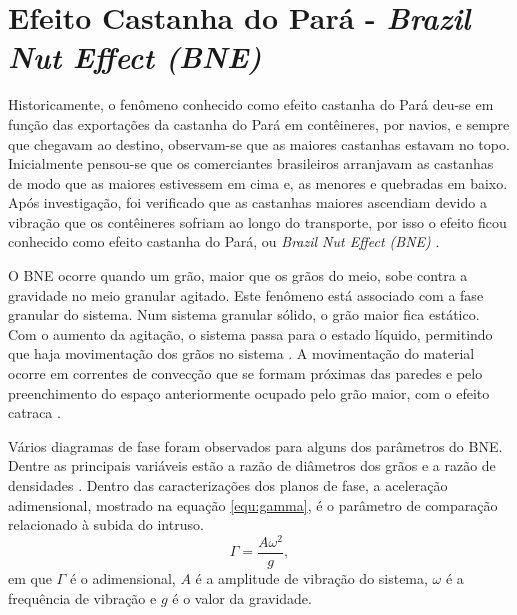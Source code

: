 \chapter{Efeito Castanha do Pará - \textit{Brazil Nut Effect (BNE)}}
\label{chap:BNE}
    Historicamente, o fenômeno conhecido como efeito castanha do Pará deu-se em função das exportações da castanha do Pará em contêineres, por navios, e sempre que chegavam ao destino, observam-se que as maiores castanhas estavam no topo. Inicialmente pensou-se que os comerciantes brasileiros arranjavam as castanhas de modo que as maiores estivessem em cima e, as menores e quebradas em baixo. Após investigação, foi verificado que as castanhas maiores ascendiam devido a vibração que os contêineres sofriam ao longo do transporte, por isso o efeito ficou conhecido como efeito castanha do Pará, ou \textit{Brazil Nut Effect (BNE)} \cite{Caio-Tese}.

    O BNE ocorre quando um grão, maior que os grãos do meio, sobe contra a gravidade no meio granular agitado. Este fenômeno está associado com a fase granular do sistema. Num sistema granular sólido, o grão maior fica estático. Com o aumento da agitação, o sistema passa para o estado líquido, permitindo que haja movimentação dos grãos no sistema \cite{Why_the_Brazil_nuts_are_on_top}. A movimentação do material ocorre em correntes de convecção que se formam próximas das paredes e pelo preenchimento do espaço anteriormente ocupado pelo grão maior, com o efeito catraca \cite{Inertia_in_the_Brazil_nut_problem, The_water-enhance_Brazil_nut_effect}.

    Vários diagramas de fase foram observados para alguns dos parâmetros do BNE. Dentre as principais variáveis estão a razão de diâmetros dos grãos e a razão de densidades \cite{A_Horizontal_Brazil-Nut_Effect_and_Its_Reverse, Brazil-Nut_effect_Size_separation_of_granular_particles, Brazil-nut_effect_versus_reverse_Brazil-nut_effect_in_a_moderately_dense_granular_fluid, Categorization_of_Brazil_nut_and_its_reverse_under_less-convective_conditions_for_microgravity_geology, Competition_of_Brazil_nut_effect_buoyancy_and_inelasticity_induced_segregation_in_a_granular_mixture, Reverse_Brazil_Nut_Problem_Competition_between_Percolation_and_Condensation, Reversing_the_Brazil-Nut_Effect_Competition_between_Percolation_and_Condensation, Reverse_buoyancy_in_a_vibrated_granular_bed_Computer_Simulations, Scaling_behavior_in_convection-driven_Brazil-nut_effect, Segregation_in_a_fluidized_binary_granular_mixture_Competition_between_buoyancy_and_geometric_forces, Simple_model_for_reverse_buoyancy_in_a_vibrated_granular_system}. Dentro das caracterizações dos planos de fase, a aceleração adimensional, mostrado na equação \ref{equ:gamma}, é o parâmetro de comparação relacionado à subida do intruso.
\begin{equation}
    \label{equ:gamma}
    \Gamma = \frac{A\omega^{2}}{g},
\end{equation}
em que $\Gamma$ é o adimensional, $A$ é a amplitude de vibração do sistema, $\omega$ é a frequência de vibração e $g$ é o valor da gravidade.

